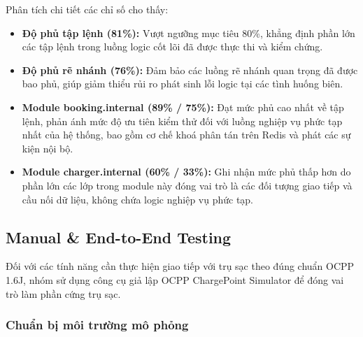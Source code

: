 Phân tích chi tiết các chỉ số cho thấy:

\begin{itemize}
    \item \textbf{Độ phủ tập lệnh (81\%):} Vượt ngưỡng mục tiêu 80\%, khẳng định phần lớn các tập lệnh trong luồng logic cốt lõi đã được thực thi và kiểm chứng.

    \item \textbf{Độ phủ rẽ nhánh (76\%):} Đảm bảo các luồng rẽ nhánh quan trọng đã được bao phủ, giúp giảm thiểu rủi ro phát sinh lỗi logic tại các tình huống biên.

    \item \textbf{Module booking.internal (89\% / 75\%):} Đạt mức phủ cao nhất về tập lệnh, phản ánh mức độ ưu tiên kiểm thử đối với luồng nghiệp vụ phức tạp nhất của hệ thống, bao gồm cơ chế khoá phân tán trên Redis và phát các sự kiện nội bộ.

    \item \textbf{Module charger.internal (60\% / 33\%):} Ghi nhận mức phủ thấp hơn do phần lớn các lớp trong module này đóng vai trò là các đối tượng giao tiếp và cầu nối dữ liệu, không chứa logic nghiệp vụ phức tạp.
\end{itemize}

\subsection{Manual \& End-to-End Testing}

\hspace*{\parindent}
Đối với các tính năng cần thực hiện giao tiếp với trụ sạc theo đúng chuẩn OCPP 1.6J, nhóm sử dụng công cụ giả lập OCPP ChargePoint Simulator để đóng vai trò làm phần cứng trụ sạc.

\subsubsection{Chuẩn bị môi trường mô phỏng}

